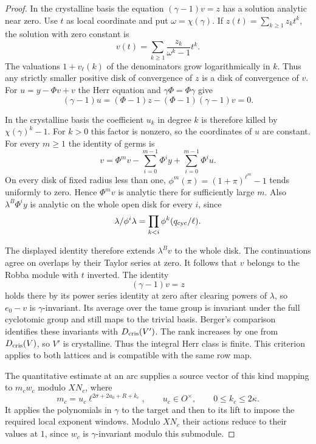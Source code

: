 \begin{proof}
In the crystalline basis the equation \((\gamma-1)v=z\)
has a solution analytic near zero. Use \(t\) as local
coordinate and put \(\omega=\chi(\gamma)\). If
\(z(t)=\sum_{k\ge1} z_k t^k\), the solution with zero
constant is
\[
          v(t)=\sum_{k\ge1}\frac{z_k}{\omega^k-1}t^k .
\]
The valuations \(1+v_\ell(k)\) of the denominators grow
logarithmically in \(k\). Thus any strictly smaller positive disk of convergence of
\(z\) is a disk of convergence of \(v\). For \(u=y-\Phi v+v\)
the Herr equation and \(\gamma\Phi=\Phi\gamma\) give
\[
 (\gamma-1)u=(\Phi-1)z-(\Phi-1)(\gamma-1)v=0 .
\]

In the crystalline basis the coefficient \(u_k\) in degree \(k\)
is therefore killed by \(\chi(\gamma)^k-1\). For \(k>0\) this
factor is nonzero, so the coordinates of \(u\) are constant. For every \(m\ge1\)
the identity of germs is
\[
 v=\Phi^m v-\sum_{i=0}^{m-1}\Phi^i y+\sum_{i=0}^{m-1}\Phi^i u.
\]
On every disk of fixed radius less than one,
\(\phi^m(\pi)=(1+\pi)^{\ell^m}-1\) tends uniformly to zero.
Hence \(\Phi^m v\) is analytic there for sufficiently large
\(m\). Also \(\lambda^B\Phi^i y\) is analytic on the
whole open disk for every \(i\), since
\[
 \lambda/\phi^i\lambda=\prod_{k<i}\phi^k(q_{\rm cyc}/\ell).
\]

The displayed identity therefore extends \(\lambda^B v\)
to the whole disk. The continuations agree on overlaps by
their Taylor series at zero. It follows that \(v\) belongs
to the Robba module with \(t\) inverted. The identity
\[
 (\gamma-1)v=z
\]
holds there by its power series identity
at zero after clearing powers of \(\lambda\), so \(e_0-v\)
is \(\gamma\)-invariant. Its average over the tame
group is invariant under the full cyclotomic group and still
maps to the trivial basis. Berger's comparison
\cite[Theorem 0.2]{berger-differential} identifies these
invariants with \(D_{\rm cris}(V')\). The rank increases
by one from \(D_{\rm cris}(V)\), so \(V'\) is crystalline.
Thus the integral Herr class is finite. This criterion applies
to both lattices and is compatible with the same row map.

The quantitative estimate at an arc supplies a source vector
of this kind mapping to \(m_c w_c\) modulo \(XN_c\), where
\[
 m_c=u_c\ell^{2\sigma+2a_0+R+k_c},\qquad u_c\in O^\times,
                 \qquad 0\le k_c\le2\kappa.
\]
It applies the polynomials in \(\gamma\) to the target and then
to its lift to impose the required local exponent windows.
Modulo \(XN_c\) their actions reduce to their values at \(1\),
since \(w_c\) is \(\gamma\)-invariant modulo this submodule.


\end{proof}
